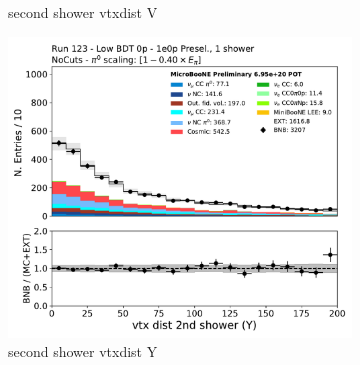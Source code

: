 \begin{figure}[H]
\begin{subfigure}{0.3\textwidth}
    \caption{second shower vtxdist V}
    \end{subfigure}
    \begin{subfigure}{0.3\textwidth}
    \includegraphics[width=1.0\textwidth]{1e0p/Low_BDT_Sideband/secondshower_Y_vtxdist.pdf}
    \caption{second shower vtxdist Y}
    \end{subfigure}
    \caption{} 
    \label{fig:HE_1eNp_1}
\end{figure}

